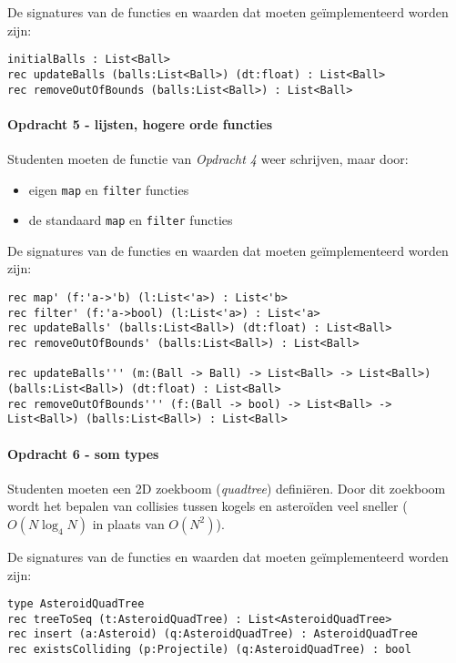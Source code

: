             De signatures van de functies en waarden dat moeten geïmplementeerd worden zijn:
			\begin{lstlisting}
initialBalls : List<Ball>
rec updateBalls (balls:List<Ball>) (dt:float) : List<Ball>
rec removeOutOfBounds (balls:List<Ball>) : List<Ball>
			\end{lstlisting}


		\paragraph{Opdracht 5 - lijsten, hogere orde functies}
			Studenten moeten de functie van \textit{Opdracht 4} weer schrijven, maar door:
				\begin{itemize}
					\item eigen \texttt{map} en \texttt{filter} functies
					\item de standaard \texttt{map} en \texttt{filter} functies
				\end{itemize}

            De signatures van de functies en waarden dat moeten geïmplementeerd worden zijn:
			\begin{lstlisting}
rec map' (f:'a->'b) (l:List<'a>) : List<'b>
rec filter' (f:'a->bool) (l:List<'a>) : List<'a>
rec updateBalls' (balls:List<Ball>) (dt:float) : List<Ball>
rec removeOutOfBounds' (balls:List<Ball>) : List<Ball>

rec updateBalls''' (m:(Ball -> Ball) -> List<Ball> -> List<Ball>) (balls:List<Ball>) (dt:float) : List<Ball>
rec removeOutOfBounds''' (f:(Ball -> bool) -> List<Ball> -> List<Ball>) (balls:List<Ball>) : List<Ball>
			\end{lstlisting}


		\paragraph{Opdracht 6 - som types}
			Studenten moeten een 2D zoekboom (\textit{quadtree}) definiëren. Door dit zoekboom wordt het bepalen van collisies tussen kogels en asteroïden veel sneller ($O(N \log_4 N)$ in plaats van $O(N^2)$).

            De signatures van de functies en waarden dat moeten geïmplementeerd worden zijn:
			\begin{lstlisting}
type AsteroidQuadTree
rec treeToSeq (t:AsteroidQuadTree) : List<AsteroidQuadTree>
rec insert (a:Asteroid) (q:AsteroidQuadTree) : AsteroidQuadTree
rec existsColliding (p:Projectile) (q:AsteroidQuadTree) : bool
			\end{lstlisting}

